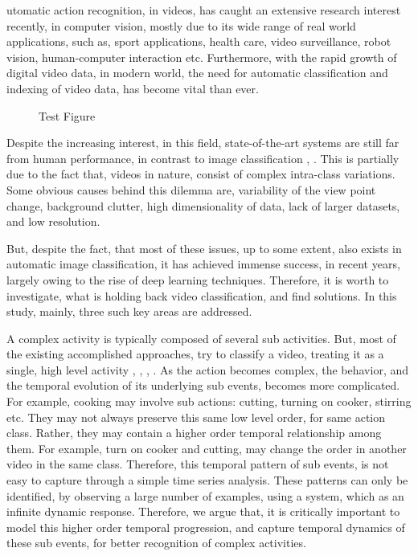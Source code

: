  utomatic action recognition, in videos, has caught an extensive research interest recently, 
in computer vision, mostly due to its wide range of real world applications, such as, 
sport applications, health care, video surveillance, robot vision, human-computer interaction
etc. Furthermore, with the rapid growth of digital video data, in modern world, 
the need for automatic
classification and indexing of video data, has become vital than ever. 

    




\begin{figure}
  \centering
  
  \caption{Test Figure}\label{fi:test1}
\end{figure}



Despite the increasing interest, in this field, state-of-the-art
systems are still far from human performance, in contrast to image classification \cite{girshick2014rich},
 \cite{krizhevsky2012imagenet}. This is
partially due to the fact that, videos in nature, consist of complex intra-class variations. Some
obvious causes behind this dilemma are, variability of the view point change, background 
clutter, high dimensionality of data, lack of larger datasets, and low resolution. 

But, despite the fact, that most of these issues, up to some extent, also exists in 
automatic image classification, it has achieved immense success, in recent years,
largely owing to the rise of deep learning techniques. Therefore, it is worth to investigate,
what is holding back video classification, and find solutions. In this study, mainly, three such key
areas are addressed.

A complex activity is typically composed of several sub activities. 
But, most of the existing accomplished approaches, try to classify a video, treating it as a 
single, high level activity \cite{wang2011action}, \cite{wang2013action}, \cite{simonyan2014two}, 
\cite{7486474}.
As the action becomes complex, the behavior, and the 
temporal evolution of its underlying sub events, becomes more complicated. For example,
cooking may involve sub actions: cutting, turning on cooker, stirring etc. They may not always preserve this 
same low level order, for same action class. Rather, they may contain 
a higher order temporal relationship among them. For example, turn on cooker and cutting,
may change the order in another video in the same class. 
Therefore, this temporal pattern of sub events, is not easy to capture through a simple
time series analysis. These patterns can only be identified, by observing a large number
of examples, using a system, which as an infinite dynamic response. Therefore, we argue that, it is critically important to
model this higher order temporal
progression, and capture temporal dynamics of these sub events, for better recognition of
complex activities. 

